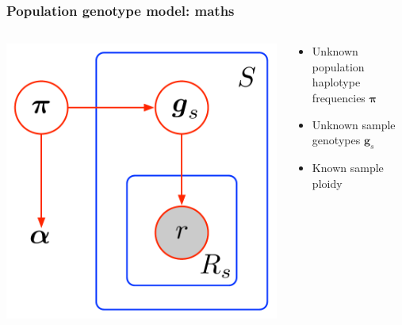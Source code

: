 \documentclass{beamer}
\begin{document}
\begin{frame}
\frametitle{Population genotype model: maths}

\begin{columns}[c]

\begin{column}{.4\textwidth}
    \includegraphics[width=\linewidth]{images/population_model}
\end{column}

\begin{column}{.6\textwidth}

\begin{itemize}
\item Unknown population haplotype frequencies $\boldsymbol{\pi}$
\item Unknown sample genotypes $\boldsymbol{g}_s$
\item Known sample ploidy
\end{itemize}

\end{column}
\end{columns}



\end{frame}
\end{document}
